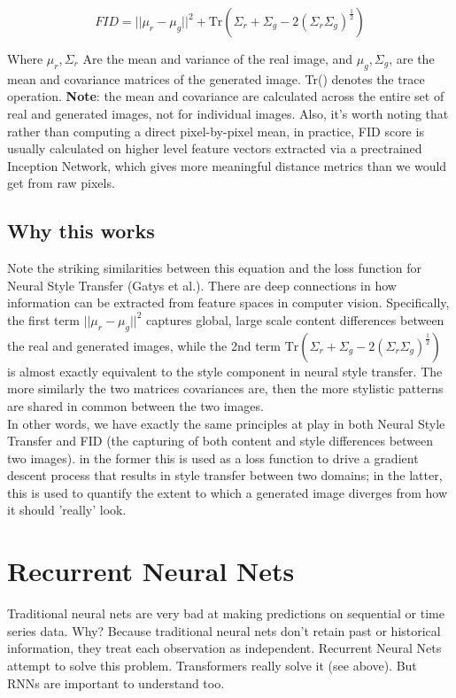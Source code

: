 \documentclass[12pt]{article}
\begin{document}
\[FID = ||\mu_r - \mu_g ||^2 + \text{Tr}(\Sigma_r + \Sigma_g - 2(\Sigma_r\Sigma_g)^{\frac{1}{2}})\]



Where \(\mu_r, \Sigma_r\) Are the mean and variance of the real image, and \(\mu_g, \Sigma_g\), are the mean and covariance matrices of the generated image. Tr() denotes the trace operation. \textbf{Note}: the mean and covariance are calculated across the entire set of real and generated images, not for individual images. Also, it's worth noting that rather than computing a direct pixel-by-pixel mean, in practice, FID score is usually calculated on higher level feature vectors extracted via a prectrained Inception Network, which gives more meaningful distance metrics than we would get from raw pixels.

\subsection{Why this works}

Note the striking similarities between this equation and the loss function for Neural Style Transfer (Gatys et al.). There are deep connections in how information can be extracted from feature spaces in computer vision. Specifically, the first term \(||\mu_r - \mu_g ||^2\) captures global, large scale content differences between the real and generated images, while the 2nd term \(\text{Tr}(\Sigma_r + \Sigma_g - 2(\Sigma_r\Sigma_g)^{\frac{1}{2}})\) is almost exactly equivalent to the style component in neural style transfer. The more similarly the two matrices covariances are, then the more stylistic patterns are shared in common between the two images.\\

In other words, we have exactly the same principles at play in both Neural Style Transfer and FID (the capturing of both content and style differences between two images). in the former this is used as a loss function to drive a gradient descent process that results in style transfer between two domains; in the latter, this is used to quantify the extent to which a generated image diverges from how it should 'really' look. 

\section{Recurrent Neural Nets}

Traditional neural nets are very bad at making predictions on sequential or time series data. Why? Because traditional neural nets don't retain past or historical information, they treat each observation as independent. Recurrent Neural Nets attempt to solve this problem. Transformers really solve it (see above). But RNNs are important to understand too.
\end{document}
